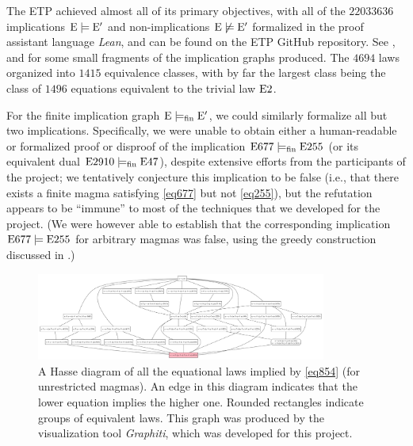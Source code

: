 The ETP achieved almost all of its primary objectives, with all of the $\num{22033636}$ implications ${\mathrm{E}} \models {\mathrm{E}'}$ and non-implications $\mathrm{E} \not \models {\mathrm{E}'}$ formalized in the proof assistant language \emph{Lean}, and can be found on the ETP GitHub repository.  See ,  and  for some small fragments of the implication graphs produced.
The $\num{4694}$ laws organized into $\num{1415}$ equivalence classes, with by far the largest class being the class of $\num{1496}$ equations equivalent to the trivial law $\mathrm{E}2$.

For the finite implication graph ${\mathrm{E}} \models_{\mathrm{fin}} {\mathrm{E}'}$, we could similarly formalize all but two implications.  Specifically, we were unable to obtain either a human-readable or formalized proof or disproof of the implication $\mathrm{E}677 \models_{\mathrm{fin}} \mathrm{E}255$ (or its equivalent dual $\mathrm{E}2910 \models_{\mathrm{fin}} \mathrm{E}47$), despite extensive efforts from the participants of the project; we tentatively conjecture this implication to be false (i.e., that there exists a finite magma satisfying \eqref{eq677} but not \eqref{eq255}), but the refutation appears to be ``immune'' to most of the techniques that we developed for the project.  (We were however able to establish that the corresponding implication $\mathrm{E}677 \models \mathrm{E}255$ for arbitrary magmas was false, using the greedy construction discussed in .)

\begin{figure}
\centering
\includegraphics[width=0.85\textwidth]{854.png}
\caption{A Hasse diagram of all the equational laws implied by \eqref{eq854} (for unrestricted magmas).  An edge in this diagram indicates that the lower equation implies the higher one. Rounded rectangles indicate groups of equivalent laws.  This graph was produced by the visualization tool \emph{Graphiti}, which was developed for this project.}
\label{fig:854}
\end{figure}

